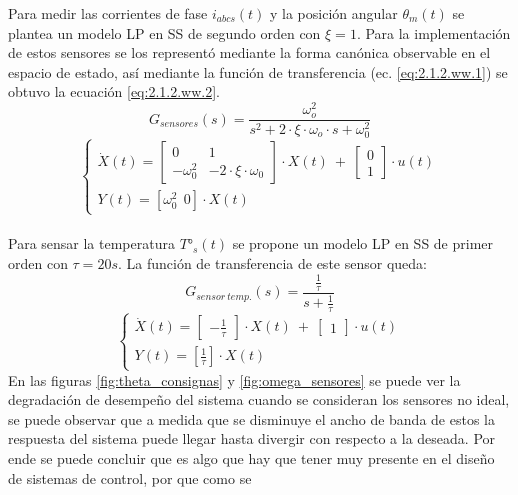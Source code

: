 \documentclass[10pt]{article}
\begin{document}
\begin{itemize}
Para medir las corrientes de fase $i_{abcs}(t)$ y la posición angular $\theta_{m}(t)$ se plantea un modelo LP en SS de segundo orden con $\xi=1$. 
Para la implementación de estos sensores se los representó mediante la forma canónica observable en el espacio de estado, así mediante la función de transferencia (ec. \ref{eq:2.1.2.ww.1}) se obtuvo la ecuación \ref{eq:2.1.2.ww.2}.
		\begin{equation}
		G_{sensores}(s)=\frac{\omega_{o}^{2}}{s^{2}+ 2\cdot\xi\cdot\omega_{o}\cdot s + \omega_{0}^{2}}
			\label{eq:2.1.2.ww.1}
	\end{equation}
			\begin{equation}
\begin{cases}
\dot{X}(t)=\begin{bmatrix}
0 & 1\\ 
-\omega_{0}^{2} & -2\cdot\xi\cdot\omega_{0}
\end{bmatrix}
\cdot X(t)  \ + \
\begin{bmatrix}
0\\ 
1
\end{bmatrix} \cdot
u(t)
\\ 
Y(t)=[\omega_{0}^{2} \ \ 0]\cdot X(t)
\end{cases}
			\label{eq:2.1.2.ww.2}
	\end{equation}\\
Para sensar la temperatura $T°_{s}(t)$ se propone un modelo LP en SS de primer orden con $\tau=20s$. La función de transferencia de este sensor queda:
\begin{equation}
	G_{sensor\ temp.}(s)=\frac{ \frac{1}{\tau } }{ s + \frac{1}{\tau } }
\end{equation}
\begin{equation}
	\begin{cases}
	\dot{X}(t)=\begin{bmatrix}
	-\frac{1}{\tau }
	\end{bmatrix}
	\cdot X(t)  \ + \
	\begin{bmatrix}
	1
	\end{bmatrix} \cdot
	u(t)
	\\ 
	Y(t)=[\frac{1}{\tau}]\cdot X(t)
	\end{cases}
		\end{equation}
En las figuras \ref{fig:theta_consignas} y \ref{fig:omega_sensores} se puede ver la degradación de desempeño del sistema cuando se consideran los sensores no ideal, se puede observar que a medida que se disminuye el ancho de banda de estos
 la respuesta del sistema puede llegar hasta divergir con respecto a la deseada. Por ende se puede concluir que es algo que hay que tener muy presente en el diseño de sistemas de control, por que como se 

\end{itemize}
\end{document}
